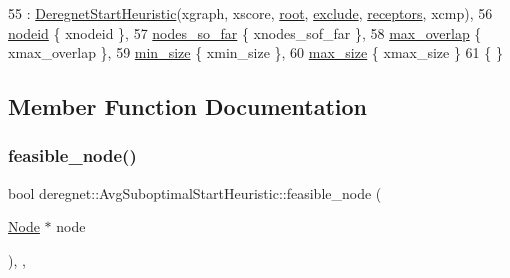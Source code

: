\begin{DoxyCode}
55  : \hyperlink{classderegnet_1_1DeregnetStartHeuristic_af7fa694b10f54c669fce9431214ffc98}{DeregnetStartHeuristic}(xgraph, xscore, \hyperlink{classderegnet_1_1DeregnetStartHeuristic_a4605d41352e3adf1f9f9f32466a4e61e}{root}, 
      \hyperlink{classderegnet_1_1DeregnetStartHeuristic_aa22c6581cd404bf7ac325850b28dc951}{exclude}, \hyperlink{classderegnet_1_1DeregnetStartHeuristic_ab80c046ff2b7c64086fceb84987b3e50}{receptors}, xcmp),
56    \hyperlink{classderegnet_1_1AvgSuboptimalStartHeuristic_af59e6b6ba10fd5d2c210a0947cf37e66}{nodeid} \{ xnodeid \},
57    \hyperlink{classderegnet_1_1AvgSuboptimalStartHeuristic_ac07c2b61bf03b25e1bd87cb353bd4597}{nodes\_so\_far} \{ xnodes\_sof\_far \},
58    \hyperlink{classderegnet_1_1AvgSuboptimalStartHeuristic_a6e019ada1557663d456e7f81757d14ab}{max\_overlap} \{ xmax\_overlap \},
59    \hyperlink{classderegnet_1_1AvgSuboptimalStartHeuristic_a71b5a73f79c4c161e9df9085ece2c270}{min\_size} \{ xmin\_size \},
60    \hyperlink{classderegnet_1_1AvgSuboptimalStartHeuristic_aafc01553c8d2a9a877f23c6bdee305aa}{max\_size} \{ xmax\_size \}
61 \{ \}
\end{DoxyCode}


\subsection{Member Function Documentation}
\mbox{\label{classderegnet_1_1AvgSuboptimalStartHeuristic_aca3dd2ae41b88a0bd925b297d490e2cb}} 
\subsubsection{\texorpdfstring{feasible\+\_\+node()}{feasible\_node()}}
{\footnotesize\ttfamily bool deregnet\+::\+Avg\+Suboptimal\+Start\+Heuristic\+::feasible\+\_\+node (\begin{DoxyParamCaption}\item[{\hyperlink{namespacederegnet_a744bad34f2de9856d36715a445f027f3}{Node} $\ast$}]{node }\end{DoxyParamCaption})\hspace{0.3cm}{\ttfamily [override]}, {\ttfamily [private]}, {\ttfamily [virtual]}}



